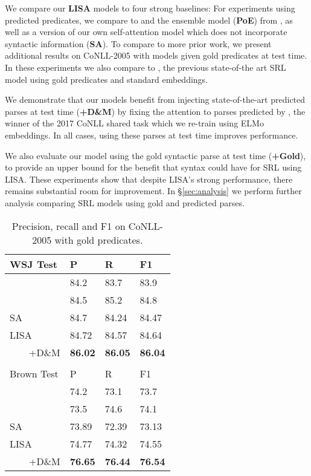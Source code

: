 \documentclass[11pt,a4paper]{article}
\begin{document}
We compare our {\bf LISA} models to four strong baselines: For experiments using predicted predicates, we compare to \citet{he2018jointly} and the ensemble model ({\bf PoE}) from \citet{he2017deep}, as well as a version of our own self-attention model which does not incorporate syntactic information ({\bf SA}). To compare to more prior work, we present additional results on CoNLL-2005 with models given gold predicates at test time. In these experiments we also compare to \citet{tan2018deep}, the previous state-of-the art SRL model using gold predicates and standard embeddings.

We demonstrate that our models benefit from injecting state-of-the-art predicted parses at test time ({\bf +D\&M}) by fixing the attention to parses predicted by \citet{dozat2017deep}, the winner of the 2017 CoNLL shared task \citep{zeman2017conll} which we re-train using ELMo embeddings. In all cases, using these parses at test time improves performance. 

We also evaluate our model using the gold syntactic parse at test time ({\bf +Gold}), to provide an upper bound for the benefit that syntax could have for SRL using LISA. These experiments show that despite LISA's strong performance, there remains substantial room for improvement. In \S\ref{sec:analysis} we perform further analysis comparing SRL models using gold and predicted parses.


\begin{table}
\begin{tabular}{llll}
WSJ Test & P & R & F1 \\ \hline \hline
\citet{he2018jointly} & 84.2 & 83.7 & 83.9 \\
\citet{tan2018deep} & 84.5 & 85.2 & 84.8 \\ \hline
SA & 84.7 & 84.24 & 84.47 \\
LISA & 84.72 &	84.57	& 84.64 \\ \ \ \ \ +D\&M & {\bf 86.02} &	{\bf 86.05} &	{\bf 86.04}  \\
& & & \\
Brown Test &  P & R & F1 \\ \hline \hline
\citet{he2018jointly} & 74.2 & 73.1 & 73.7 \\
\citet{tan2018deep} & 73.5 & 74.6 & 74.1 \\ \hline
SA & 73.89 & 72.39 & 73.13 \\
LISA & 74.77 & 74.32 &	74.55 \\ \ \ \ \ +D\&M & {\bf 76.65} & {\bf 76.44} & {\bf 76.54} \\ \end{tabular}
\caption{Precision, recall and F1 on CoNLL-2005 with gold predicates. \label{tab:conll05-gold-pred}}
\end{table}
\end{document}
